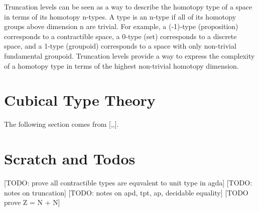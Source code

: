 \documentclass{article}
\begin{document}
\begin{remark}[Relationship]
  Truncation levels can be seen as a way to describe the homotopy type of a space in terms of its homotopy n-types. A type is an n-type if all of its homotopy groups above dimension n are trivial. For example, a (-1)-type (proposition) corresponds to a contractible space, a 0-type (set) corresponds to a discrete space, and a 1-type (groupoid) corresponds to a space with only non-trivial fundamental groupoid. Truncation levels provide a way to express the complexity of a homotopy type in terms of the highest non-trivial homotopy dimension.
\end{remark}

\section{Cubical Type Theory}
The following section comes from [\cite{CCHM},\cite{ABCFHL},\cite{Cavallo}].

\section{Scratch and Todos}

[TODO: prove all contractible types are equvalent to unit type in agda]
[TODO: notes on truncation]
[TODO: notes on apd, tpt, ap, decidable equality]
[TODO prove Z = N + N]



\end{document}
